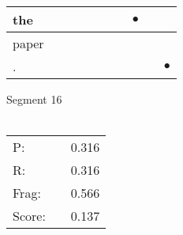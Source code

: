 \documentclass[landscape]{article}
\newcommand{\ssp}{\hspace{2pt}}
\newcommand{\mex}{\cellcolor{g}$\bullet$}
\begin{document}
\begin{tabular}{|l|p{10pt}|p{10pt}|p{10pt}|p{10pt}|p{10pt}|p{10pt}|p{10pt}|p{10pt}|p{10pt}|}
\hline
\ssp \cellcolor{ref6}the \ssp&\hspace{2pt}&\hspace{2pt}&\hspace{2pt}&\hspace{2pt}&\hspace{2pt}&\hspace{2pt}&\hspace{2pt}\mex&\hspace{2pt}&\hspace{2pt}\\
\hline
\ssp paper \ssp&\hspace{2pt}&\hspace{2pt}&\hspace{2pt}&\hspace{2pt}&\hspace{2pt}&\hspace{2pt}&\hspace{2pt}&\hspace{2pt}&\hspace{2pt}\\
\hline
\ssp \cellcolor{ref8}. \ssp&\hspace{2pt}&\hspace{2pt}&\hspace{2pt}&\hspace{2pt}&\hspace{2pt}&\hspace{2pt}&\hspace{2pt}&\hspace{2pt}&\hspace{2pt}\mex\\
\hline
\end{tabular}

\vspace{6pt}
\noindent Segment 16\\\\
\noindent\begin{tabular}{lm{12pt}r}
\hline
P:&&0.316\\
R:&&0.316\\
Frag:&&0.566\\
Score:&&0.137\\
\end{tabular}

\newpage
\end{document}
